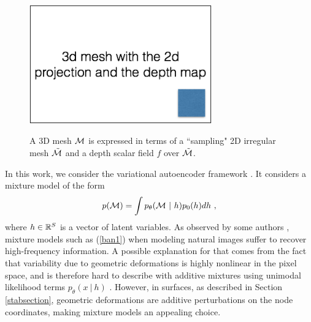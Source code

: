 \begin{figure}
\centering
\includegraphics[width=0.7\textwidth]{figures/generative_fig.png}
\label{genfigure}
\caption{A 3D mesh ${\mathcal{M}}$ is expressed in terms of a ``sampling" 2D irregular mesh $\tilde{{\mathcal{M}}}$ and a depth scalar field $f$ over $\tilde{{\mathcal{M}}}$.}  
\end{figure}

In this work, we consider the variational autoencoder framework \cite{vae, vae2}. 
It considers a mixture model of the form 
\begin{equation}
\label{ban1}
p({\mathcal{M}}) = \int p_\theta({\mathcal{M}} ~|~h) p_0(h) dh~,
\end{equation}
where $h \in {\mathbb{R}}^S$ is a vector of latent variables. 
As observed by some authors \cite{ganvsvae}, 
mixture models such as (\ref{ban1}) when modeling natural images
suffer to recover high-frequency information. A possible 
explanation for that comes from the fact that variability due to 
geometric deformations is highly nonlinear in the pixel space, 
and is therefore hard to describe with additive mixtures using
unimodal likelihood terms $p_\theta( x ~|~h)$ \cite{superresjoan}. 
However, in surfaces, as described in Section \ref{stabsection}, 
geometric deformations are additive perturbations on the node 
coordinates, making mixture models an appealing choice.

